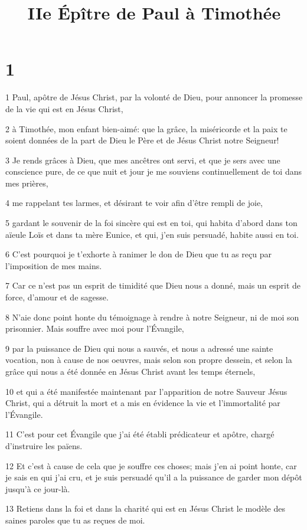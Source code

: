 

\title{IIe Épître de Paul à Timothée}


\chapter{1}

\par 1 Paul, apôtre de Jésus Christ, par la volonté de Dieu, pour annoncer la promesse de la vie qui est en Jésus Christ,
\par 2 à Timothée, mon enfant bien-aimé: que la grâce, la miséricorde et la paix te soient données de la part de Dieu le Père et de Jésus Christ notre Seigneur!
\par 3 Je rends grâces à Dieu, que mes ancêtres ont servi, et que je sers avec une conscience pure, de ce que nuit et jour je me souviens continuellement de toi dans mes prières,
\par 4 me rappelant tes larmes, et désirant te voir afin d'être rempli de joie,
\par 5 gardant le souvenir de la foi sincère qui est en toi, qui habita d'abord dans ton aïeule Loïs et dans ta mère Eunice, et qui, j'en suis persuadé, habite aussi en toi.
\par 6 C'est pourquoi je t'exhorte à ranimer le don de Dieu que tu as reçu par l'imposition de mes mains.
\par 7 Car ce n'est pas un esprit de timidité que Dieu nous a donné, mais un esprit de force, d'amour et de sagesse.
\par 8 N'aie donc point honte du témoignage à rendre à notre Seigneur, ni de moi son prisonnier. Mais souffre avec moi pour l'Évangile,
\par 9 par la puissance de Dieu qui nous a sauvés, et nous a adressé une sainte vocation, non à cause de nos oeuvres, mais selon son propre dessein, et selon la grâce qui nous a été donnée en Jésus Christ avant les temps éternels,
\par 10 et qui a été manifestée maintenant par l'apparition de notre Sauveur Jésus Christ, qui a détruit la mort et a mis en évidence la vie et l'immortalité par l'Évangile.
\par 11 C'est pour cet Évangile que j'ai été établi prédicateur et apôtre, chargé d'instruire les païens.
\par 12 Et c'est à cause de cela que je souffre ces choses; mais j'en ai point honte, car je sais en qui j'ai cru, et je suis persuadé qu'il a la puissance de garder mon dépôt jusqu'à ce jour-là.
\par 13 Retiens dans la foi et dans la charité qui est en Jésus Christ le modèle des saines paroles que tu as reçues de moi.
